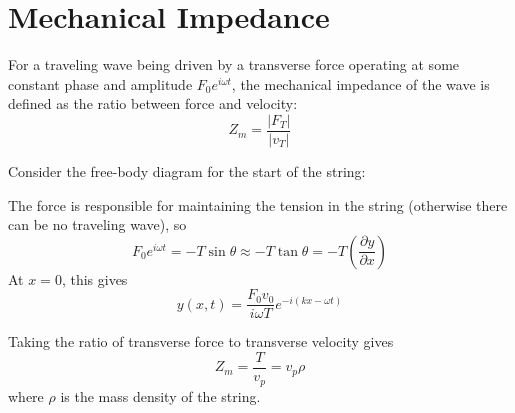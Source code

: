 \documentclass[11pt]{article}
\begin{document}
\section{Mechanical Impedance}
	For a traveling wave being driven by a transverse force operating at some constant phase and amplitude $F_0e^{i\omega t}$, the mechanical impedance of the wave is defined as the ratio between force and velocity:
	\begin{equation}
		Z_m = \frac{|F_T|}{|v_T|}
	\end{equation}
	
	Consider the free-body diagram for the start of the string:
	\begin{center}
	\end{center}
	The force is responsible for maintaining the tension in the string (otherwise there can be no traveling wave), so
	\begin{equation}
		F_0e^{i\omega t} = -T\sin\theta \approx -T \tan \theta = -T \left(\frac{\partial y}{\partial x}\right)
	\end{equation}
	At $x = 0$, this gives
	\begin{equation}
		y(x, t) = \frac{F_0v_0}{i\omega T}e^{-i(kx - \omega t)}
	\end{equation}
	
	Taking the ratio of transverse force to transverse velocity gives
	\begin{equation}
		Z_m = \frac{T}{v_p} = v_p\rho
	\end{equation}
	where $\rho$ is the mass density of the string.
	
\end{document}
